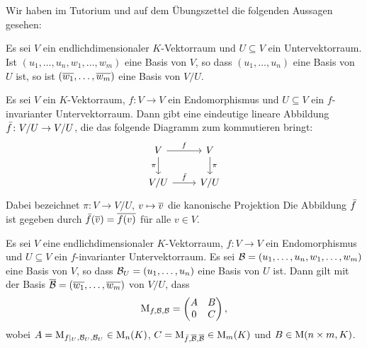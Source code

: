 \section{}

Wir haben im Tutorium und auf dem Übungszettel die folgenden Aussagen gesehen:

\begin{lemma}
  Es sei $V$ ein endlichdimensionaler $K$-Vektorraum und $U \subseteq V$ ein Untervektorraum.
  Ist $(u_1, \dotsc, u_n, w_1, \dotsc, w_m)$ eine Basis von $V$, so dass $(u_1, \dotsc, u_n)$ eine Basis von $U$ ist, so ist $(\overline{w_1}, \dotsc, \overline{w_m})$ eine Basis von $V/U$.
\end{lemma}


\begin{lemma}
  Es sei $V$ ein $K$-Vektorraum, $f \colon V \to V$ ein Endomorphismus und $U \subseteq V$ ein $f$-invarianter Untervektorraum.
  Dann gibt eine eindeutige lineare Abbildung $\bar{f} \colon V/U \to V/U$, die das folgende Diagramm zum kommutieren bringt:
  \[
    \begin{tikzcd}
        V
        \arrow{r}{f}
        \arrow[swap]{d}{\pi}
      & V
        \arrow{d}{\pi}
      \\
        V/U
        \arrow{r}{\induced{f}}
      & V/U
    \end{tikzcd}
  \]
  Dabei bezeichnet $\pi \colon V \to V/U$, $v \mapsto \overline{v}$ die kanonische Projektion
  Die Abbildung $\bar{f}$ ist gegeben durch $\bar{f}(\overline{v}) = \overline{f(v)}$ für alle $v \in V$.
\end{lemma}

\begin{lemma}
  \label{lemma: block form coming from invariant subspaces}
  Es sei $V$ eine endlichdimensionaler $K$-Vektorraum, $f \colon V \to V$ ein Endomorphismus und $U \subseteq V$ ein $f$-invarianter Untervektorraum.
  Es sei $\mathcal{B} = (u_1, \dotsc, u_n, w_1, \dotsc, w_m)$ eine Basis von $V$, so dass $\mathcal{B}_U = (u_1, \dotsc, u_n)$ eine Basis von $U$ ist.
  Dann gilt mit der Basis $\overline{\mathcal{B}} = (\overline{w_1}, \dotsc, \overline{w_m})$ von $V/U$, dass
  \[
      \operatorname{M}_{f, \mathcal{B}, \mathcal{B}}
    = \begin{pmatrix}
        A & B
      \\
        0 & C
      \end{pmatrix},
  \]
  wobei $A = \operatorname{M}_{f|_U, \mathcal{B}_U, \mathcal{B}_U} \in \operatorname{M}_{n}(K)$, $C = \operatorname{M}_{\bar{f}, \overline{\mathcal{B}}, \overline{\mathcal{B}}} \in \operatorname{M}_{m}(K)$ und $B \in \operatorname{M}(n \times m, K)$.
\end{lemma}


